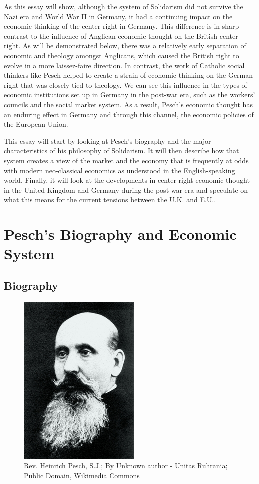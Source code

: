\documentclass{article}
\begin{document}
As this essay will show, although the system of Solidarism did not survive the Nazi era and World War II in Germany, it had a continuing impact on the economic thinking of the center-right in Germany.  This difference is in sharp contrast to the influence of Anglican economic thought on the British center-right.  As will be demonstrated below, there was a relatively early separation of economic and theology amongst Anglicans, which caused the British right to evolve in a more laissez-faire direction.  In contrast, the work of Catholic social thinkers like Pesch helped to create a strain of economic thinking on the German right that was closely tied to theology.  We can see this influence in the types of economic institutions set up in Germany in the post-war era, such as the workers’ councils and the social market system.  As a result, Pesch’s economic thought has an enduring effect in Germany and through this channel, the economic policies of the European Union.\medskip

This essay will start by looking at Pesch’s biography and the major characteristics of his philosophy of Solidarism.  It will then describe how that system creates a view of the market and the economy that is frequently at odds with modern neo-classical economics as understood in the English-speaking world.  Finally, it will look at the developments in center-right economic thought in the United Kingdom and Germany during the post-war era and speculate on what this means for the current tensions between the U.K. and E.U..

\section{Pesch's Biography and Economic System}

\subsection{Biography}

\begin{figure}
    \centering
    \includegraphics{Heinrich_Pesch.jpg}
    \caption{Rev. Heinrich Pesch, S.J.;
        By Unknown author - \href{http://www.unitas-ruhrania.org/index.php?section=news&amp;cmd=details&amp;newsid=1170}{Unitas Ruhrania}; Public Domain, \href{https://commons.wikimedia.org/w/index.php?curid=25140631}{Wikimedia Commons}
    }
    \label{fig:peschphoto}
\end{figure}
\end{document}
